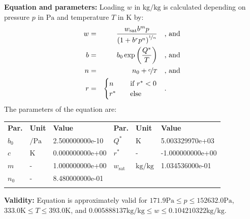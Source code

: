 \textbf{Equation and parameters:}
\newline
%
Loading $w$ in $\si{\kilogram\per\kilogram}$ is calculated depending on pressure $p$ in $\si{\pascal}$ and temperature $T$ in $\si{\kelvin}$ by:
%
\begin{equation*}
\begin{split}
w &=& \frac{w_\mathrm{sat} b^{m} p}{\left( 1 + b^{r} p^{n} \right)^{\nicefrac{1}{n}}} & \quad\text{, and} \\
b &=& b_0 \exp\left( \frac{Q^{*}}{T} \right) & \quad\text{, and} \\
n &=& n_0 + \nicefrac{c}{T} & \quad\text{, and} \\
r &=& \begin{cases} n & \quad \text{if } r^{*} < 0 \\ r^{*}  & \quad \text{else} \end{cases} & \quad\text{.}
\end{split}
\end{equation*}
%
The parameters of the equation are:
%
\begin{longtable}[l]{lll|lll}
\toprule
\addlinespace
\textbf{Par.} & \textbf{Unit} & \textbf{Value} &	\textbf{Par.} & \textbf{Unit} & \textbf{Value} \\
\addlinespace
\midrule
\endhead

\bottomrule
\endfoot
\bottomrule
\endlastfoot
\addlinespace

$b_0$ & $\si{\per\pascal}$ & 2.500000000e-10 & $Q^{*}$ & $\si{\kelvin}$ & 5.003329970e+03 \\
$c$ & $\si{\kelvin}$ & 0.000000000e+00 & $r^{*}$ & - & -1.000000000e+00 \\
$m$ & - & 1.000000000e+00 & $w_\mathrm{sat}$ & $\si{\kilogram\per\kilogram}$ & 1.034536000e-01 \\
$n_0$ & - & 8.480000000e-01 & & & \\

\addlinespace\end{longtable}

\textbf{Validity:}
\newline
Equation is approximately valid for $171.9 \si{\pascal} \leq p \leq 152632.0 \si{\pascal}$,  $333.0 \si{\kelvin} \leq T \leq 393.0 \si{\kelvin}$, and $0.005888137 \si{\kilogram\per\kilogram} \leq w \leq 0.104210322 \si{\kilogram\per\kilogram}$.
\newline

